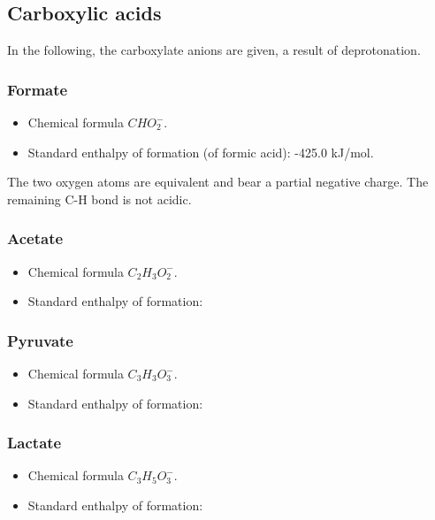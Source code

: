 \documentclass[a4paper,14pt]{extarticle}
\begin{document}
\subsection{Carboxylic acids}

In the following, the carboxylate anions are given, a result of deprotonation.

\subsubsection{Formate}
\begin{itemize}
    \item Chemical formula $CHO_2^-$.
    \item Standard enthalpy of formation (of formic acid): -425.0 kJ/mol.
\end{itemize}
The two oxygen atoms are equivalent and bear a partial negative charge. The remaining C-H
bond is not acidic.

\subsubsection{Acetate}
\begin{itemize}
    \item Chemical formula $C_2H_3O_2^-$.
    \item Standard enthalpy of formation:
\end{itemize}

\subsubsection{Pyruvate}
\begin{itemize}
    \item Chemical formula $C_3H_3O_3^-$.
    \item Standard enthalpy of formation:
\end{itemize}

\subsubsection{Lactate}
\begin{itemize}
    \item Chemical formula $C_3H_5O_3^-$.
    \item Standard enthalpy of formation:
\end{itemize}
\end{document}
